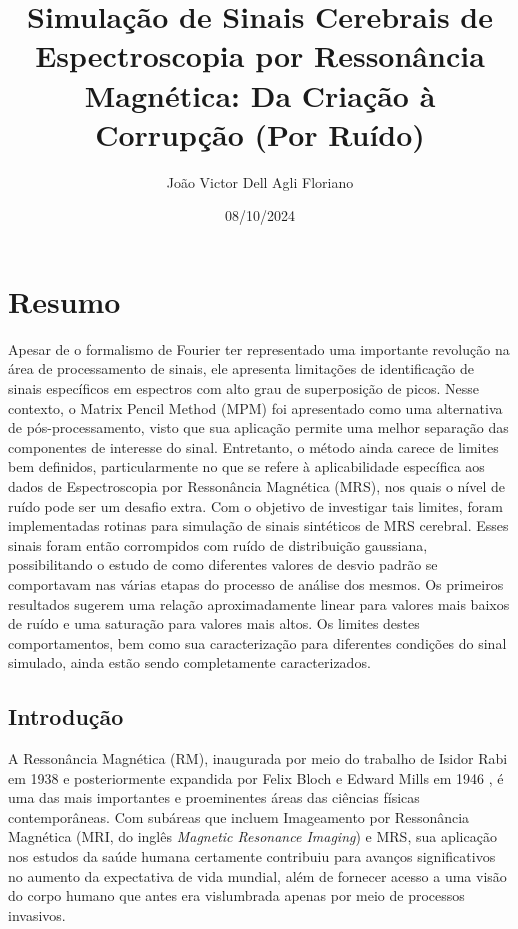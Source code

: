 \documentclass[
12pt,		
twoside, 
a4paper,
chapter=TITLE,
english,			
brazil]{USPSC-classe/USPSC}
\title{ Simulação de Sinais Cerebrais de Espectroscopia por 
Ressonância Magnética: Da Criação à Corrupção (Por Ruído)}
\author{João Victor Dell Agli Floriano}
\date{08/10/2024}
\begin{document}
\frenchspacing 

\maketitle

\section{Resumo}
Apesar de o formalismo de Fourier ter representado uma importante revolução na área de processamento 
de sinais, ele apresenta limitações de identificação de sinais específicos em espectros com alto grau 
de superposição de picos. Nesse contexto, o Matrix Pencil Method (MPM) foi apresentado como uma 
alternativa de pós-processamento, visto que sua aplicação permite uma melhor separação das componentes 
de interesse do sinal.  Entretanto, o método ainda carece de limites bem definidos, particularmente no 
que se refere à aplicabilidade específica aos dados de Espectroscopia por Ressonância Magnética (MRS), 
nos quais o nível de ruído pode ser um desafio extra. Com o objetivo de investigar tais limites, foram 
implementadas rotinas para simulação de sinais sintéticos de MRS cerebral. Esses sinais foram então 
corrompidos com ruído de distribuição gaussiana, possibilitando o estudo de como diferentes valores de 
desvio padrão se comportavam nas várias etapas do processo de análise dos mesmos. Os primeiros resultados 
sugerem uma relação aproximadamente linear para valores mais baixos de ruído e uma saturação para valores 
mais altos. Os limites destes comportamentos, bem como sua caracterização para diferentes condições do sinal 
simulado, ainda estão sendo completamente caracterizados.
\subsection{Introdução}

A Ressonância Magnética (RM), inaugurada por meio do trabalho de Isidor Rabi em 1938 \cite{PhysRev.53.318} e 
posteriormente expandida por Felix Bloch e Edward Mills em 1946 \cite{Filler2009}, é uma das mais importantes e proeminentes áreas das
ciências físicas contemporâneas. Com subáreas que incluem Imageamento por Ressonância Magnética (MRI, do inglês \textit{Magnetic Resonance Imaging}) e 
MRS, sua aplicação nos estudos da saúde humana certamente contribuiu para
avanços significativos no aumento da expectativa de vida mundial, além de fornecer acesso a uma visão do corpo humano que antes
era vislumbrada apenas por meio de processos invasivos.
\end{document}
